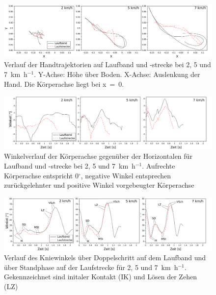 \begin{figure}[h!]
	\centering
	\includegraphics[width=\linewidth]{bilder/Ergebnisse/compare_hand}
	\caption[Handtrajektorien auf dem Laufband und -strecke]{Verlauf der Handtrajektorien auf Laufband und -strecke bei 2, 5 und 7~km~h$^{-1}$. Y-Achse: Höhe über Boden. X-Achse: Auslenkung der Hand. Die Körperachse liegt bei x~=~0.}
	\label{fig:res_compare_hand}
\end{figure}
\begin{figure}[h!]
	\centering
	\includegraphics[width=\linewidth]{bilder/Ergebnisse/compare_trunk}
	\caption[Winkelverlauf der Körperachse auf Laufband und -strecke]{Winkelverlauf der Körperachse gegenüber der Horizontalen für Laufband und -strecke bei 2, 5 und 7~km~h$^{-1}$. Aufrechte Körperachse entspricht 0$^{\circ}$, negative Winkel entsprechen zurückgelehnter und positive Winkel vorgebeugter Körperachse}
	\label{fig:res_compare_trunk}
\end{figure}%
\begin{figure}[h!]
	\centering
	\includegraphics[width=\linewidth]{bilder/Ergebnisse/compare_knee_angle_3_speeds}
	\caption{Verlauf des Kniewinkels über Doppelschritt auf dem Laufband und über Standphase auf der Laufstrecke für 2, 5 und 7~km~h$^{-1}$. Gekennzeichnet sind initaler Kontakt (IK) und Lösen der Zehen (LZ)}
	\label{fig:comp_knee_angle}
\end{figure}
